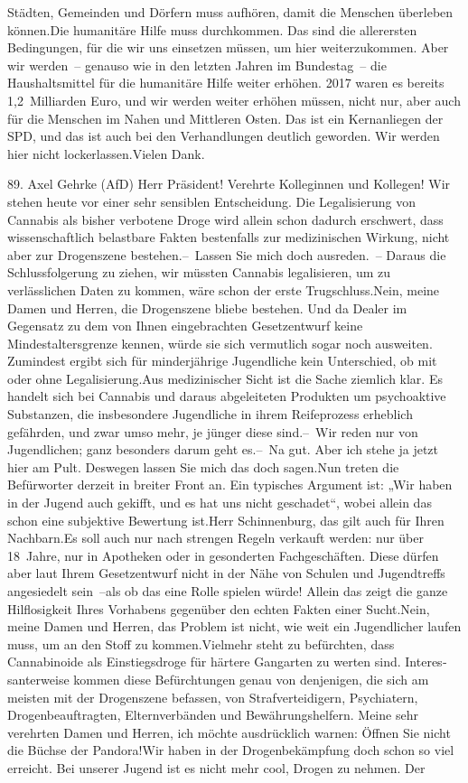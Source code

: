 \documentclass{article}
\begin{document}
Städten, Gemeinden und Dörfern muss aufhören, damit die Menschen überleben können.Die humanitäre Hilfe muss durchkommen. Das sind die allerersten Bedingungen, für die wir uns einsetzen müssen, um hier weiterzukommen. Aber wir werden – genauso wie in den letzten Jahren im Bundestag – die Haushaltsmittel für die humanitäre Hilfe weiter erhöhen. 2017 waren es bereits 1,2 Milliarden Euro, und wir werden weiter erhöhen müssen, nicht nur, aber auch für die Menschen im Nahen und Mittleren Osten. Das ist ein Kernanliegen der SPD, und das ist auch bei den Verhandlungen deutlich geworden. Wir werden hier nicht lockerlassen.Vielen Dank.




	89. Axel Gehrke (AfD) Herr Präsident! Verehrte Kolleginnen und Kollegen! Wir stehen heute vor einer sehr sensiblen Entscheidung. Die Legalisierung von Cannabis als bisher verbotene Droge wird allein schon dadurch erschwert, dass wissenschaftlich belastbare Fakten bestenfalls zur medizinischen Wirkung, nicht aber zur Drogenszene bestehen.– Lassen Sie mich doch ausreden. – Daraus die Schlussfolgerung zu ziehen, wir müssten Cannabis legalisieren, um zu verlässlichen Daten zu kommen, wäre schon der erste Trugschluss.Nein, meine Damen und Herren, die Drogenszene bliebe bestehen. Und da Dealer im Gegensatz zu dem von Ihnen eingebrachten Gesetzentwurf keine Mindestaltersgrenze kennen, würde sie sich vermutlich sogar noch ausweiten. Zumindest ergibt sich für minderjährige Jugendliche kein Unterschied, ob mit oder ohne Legalisierung.Aus medizinischer Sicht ist die Sache ziemlich klar. Es handelt sich bei Cannabis und daraus abgeleiteten Produkten um psychoaktive Substanzen, die insbesondere Jugendliche in ihrem Reifeprozess erheblich gefährden, und zwar umso mehr, je jünger diese sind.– Wir reden nur von Jugendlichen; ganz besonders darum geht es.– Na gut. Aber ich stehe ja jetzt hier am Pult. Deswegen lassen Sie mich das doch sagen.Nun treten die Befürworter derzeit in breiter Front an. Ein typisches Argument ist: „Wir haben in der Jugend auch gekifft, und es hat uns nicht geschadet“, wobei allein das schon eine subjektive Bewertung ist.Herr Schinnenburg, das gilt auch für Ihren Nachbarn.Es soll auch nur nach strengen Regeln verkauft werden: nur über 18 Jahre, nur in Apotheken oder in gesonderten Fachgeschäften. Diese dürfen aber laut Ihrem Gesetzentwurf nicht in der Nähe von Schulen und Jugendtreffs angesiedelt sein –als ob das eine Rolle spielen würde! Allein das zeigt die ganze Hilflosigkeit Ihres Vorhabens gegenüber den echten Fakten einer Sucht.Nein, meine Damen und Herren, das Problem ist nicht, wie weit ein Jugendlicher laufen muss, um an den Stoff zu kommen.Vielmehr steht zu befürchten, dass Cannabinoide als Einstiegsdroge für härtere Gangarten zu werten sind. Interes­santerweise kommen diese Befürchtungen genau von denjenigen, die sich am meisten mit der Drogenszene befassen, von Strafverteidigern, Psychiatern, Drogenbeauftragten, Elternverbänden und Bewährungshelfern. Meine sehr verehrten Damen und Herren, ich möchte ausdrücklich warnen: Öffnen Sie nicht die Büchse der Pandora!Wir haben in der Drogenbekämpfung doch schon so viel erreicht. Bei unserer Jugend ist es nicht mehr cool, Drogen zu nehmen. Der 
\end{document}
